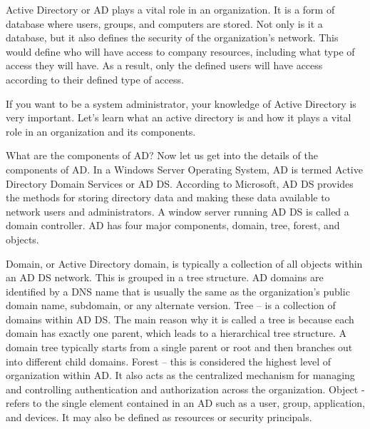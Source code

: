 Active Directory or AD plays a vital role in an organization. It is a form of database where users, groups, and computers are stored. Not only is it a database, but it also defines the security of the organization’s network. This would define who will have access to company resources, including what type of access they will have. As a result, only the defined users will have access according to their defined type of access. 

If you want to be a system administrator, your knowledge of Active Directory is very important. Let’s learn what an active directory is and how it plays a vital role in an organization and its components. 

What are the components of AD?
Now let us get into the details of the components of AD. In a Windows Server Operating System, AD is termed Active Directory Domain Services or AD DS. According to Microsoft, AD DS provides the methods for storing directory data and making these data available to network users and administrators. A window server running AD DS is called a domain controller. AD has four major components, domain, tree, forest, and objects.  

Domain, or Active Directory domain, is typically a collection of all objects within an AD DS network. This is grouped in a tree structure. AD domains are identified by a DNS name that is usually the same as the organization’s public domain name, subdomain, or any alternate version. 
Tree – is a collection of domains within AD DS. The main reason why it is called a tree is because each domain has exactly one parent, which leads to a hierarchical tree structure. A domain tree typically starts from a single parent or root and then branches out into different child domains.
Forest – this is considered the highest level of organization within AD. It also acts as the centralized mechanism for managing and controlling authentication and authorization across the organization. 
Object - refers to the single element contained in an AD such as a user, group, application, and devices. It may also be defined as resources or security principals.

